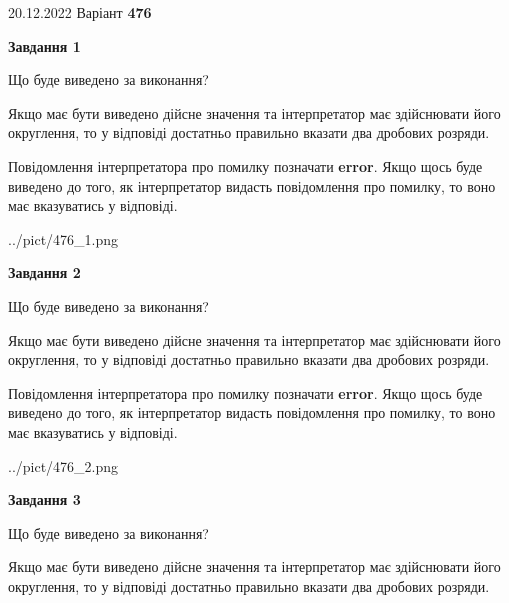 \documentclass[12pt, ukrainian]{article}
\begin{document}
{20.12.2022 Варіант \No \textbf { 476 }\par}
{
\begin {Large}

{\begin {center}\textbf{Завдання 1}\end {center}}\par
Що буде виведено за виконання? \par

Якщо має бути виведено дійсне значення та інтерпретатор має здійснювати його округлення, 
то у відповіді достатньо правильно вказати два дробових розряди.

Повідомлення інтерпретатора про помилку позначати \textbf{error}.
Якщо щось буде виведено до того, як інтерпретатор видасть повідомлення про помилку, 
то воно має вказуватись у відповіді. \par

\begin{center}
	{../pict/476_1.png}
\end{center}
\newpage

{\begin {center}\textbf{Завдання 2}\end {center}}\par
Що буде виведено за виконання? \par

Якщо має бути виведено дійсне значення та інтерпретатор має здійснювати його округлення, 
то у відповіді достатньо правильно вказати два дробових розряди.

Повідомлення інтерпретатора про помилку позначати \textbf{error}.
Якщо щось буде виведено до того, як інтерпретатор видасть повідомлення про помилку, 
то воно має вказуватись у відповіді. \par

\begin{center}
	{../pict/476_2.png}
\end{center}
\newpage

{\begin {center}\textbf{Завдання 3}\end {center}}\par
Що буде виведено за виконання? \par

Якщо має бути виведено дійсне значення та інтерпретатор має здійснювати його округлення, 
то у відповіді достатньо правильно вказати два дробових розряди.


\end{Large}}
\end{document}

